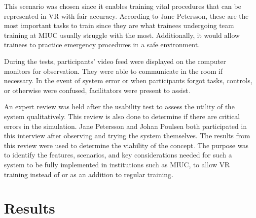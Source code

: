 \documentclass[conference]{IEEEtran}
\begin{document}
This scenario was chosen since it enables training vital procedures that can be represented in VR with fair accuracy. According to Jane Petersson, these are the most important tasks to train since they are what trainees undergoing team training at MIUC usually struggle with the most. Additionally, it would allow trainees to practice emergency procedures in a safe environment.


During the tests, participants' video feed were displayed on the computer monitors for observation. They were able to communicate in the room if necessary. In the event of system error or when participants forgot tasks, controls, or otherwise were confused, facilitators were present to assist. 


An expert review was held after the usability test to assess the utility of the system qualitatively. This review is also done to determine if there are critical errors in the simulation. Jane Petersson and Johan Poulsen both participated in this interview after observing and trying the system themselves. The results from this review were used to determine the viability of the concept. The purpose was to identify the features, scenarios, and key considerations needed for such a system to be fully implemented in institutions such as MIUC, to allow VR training instead of or as an addition to regular training.


\section{Results}
%
%

\end{document}
